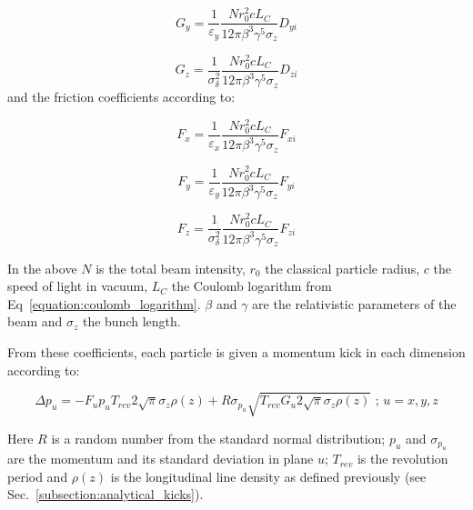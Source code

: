 \begin{equation}
    \boxed{G_y = \frac{1}{\varepsilon_y} \frac{N r_0^2 c L_C}{12 \pi \beta^3 \gamma^5 \sigma_z} D_{yi}}
    \label{equation:kinetic_vertical_diffusion_coefficient}
\end{equation}

\begin{equation}
    \boxed{G_z = \frac{1}{\sigma_{\delta}^2} \frac{N r_0^2 c L_C}{12 \pi \beta^3 \gamma^5 \sigma_z} D_{zi}}
    \label{equation:kinetic_longitudinal_diffusion_coefficient}
\end{equation}
and the friction coefficients according to:

\begin{equation}
    \boxed{F_x = \frac{1}{\varepsilon_x} \frac{N r_0^2 c L_C}{12 \pi \beta^3 \gamma^5 \sigma_z} F_{xi}}
    \label{equation:kinetic_horizontal_friction_coefficient}
\end{equation}

\begin{equation}
    \boxed{F_y = \frac{1}{\varepsilon_y} \frac{N r_0^2 c L_C}{12 \pi \beta^3 \gamma^5 \sigma_z} F_{yi}}
    \label{equation:kinetic_vertical_friction_coefficient}
\end{equation}

\begin{equation}
    \boxed{F_z = \frac{1}{\sigma_{\delta}^2} \frac{N r_0^2 c L_C}{12 \pi \beta^3 \gamma^5 \sigma_z} F_{zi}}
    \label{equation:kinetic_longitudinal_friction_coefficient}
\end{equation}

In the above \(N\) is the total beam intensity, \(r_0\) the classical particle radius, \(c\) the speed of light in vacuum, \(L_C\) the Coulomb logarithm from Eq~\eqref{equation:coulomb_logarithm}.
\(\beta\) and \(\gamma\) are the relativistic parameters of the beam and \(\sigma_z\) the bunch length.
\newline

From these coefficients, each particle is given a momentum kick in each dimension according to:

\begin{equation}
    \boxed{\Delta p_u = - F_u p_u T_{rev} 2 \sqrt{\pi} \sigma_z \rho(z) + R \sigma_{p_u} \sqrt{T_{rev} G_u 2 \sqrt{\pi} \sigma_z \rho(z)} \text{ ;   } u=x,y,z}
    \label{equation:momentum_kick_kinetic}
\end{equation}

Here \(R\) is a random number from the standard normal distribution; \(p_u\) and \(\sigma_{p_u}\) are the momentum and its standard deviation in plane \(u\); \(T_{rev}\) is the revolution period and \(\rho(z)\) is the longitudinal line density as defined previously (see Sec.~\ref{subsection:analytical_kicks}).

